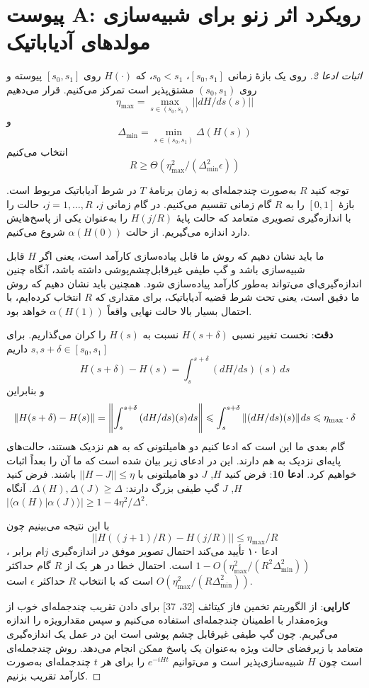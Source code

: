 \section{پیوست A: رویکرد اثر زنو برای شبیه‌سازی مولدهای آدیاباتیک}
\begin{proof}[اثبات ادعا 2]
 روی یک بازهٔ زمانی $[s_0, s_1]$، $s_0 < s_1$، که $H(\cdot)$ روی $[s_0, s_1]$ پیوسته و روی $(s_0, s_1)$ مشتق‌پذیر است تمرکز می‌کنیم. قرار می‌دهیم
  $$\eta_{\max} = \max_{s \in (s_0, s_1)} ||dH/ds(s)||$$ 
  و
   $$\Delta_{\min} = \min_{s \in (s_0, s_1)} \Delta(H(s))$$
 انتخاب می‌کنیم
  $$R \ge \Theta(\eta_{\max}^2 / (\Delta_{\min}^2 \epsilon))$$
 
 توجه کنید $R$ به‌صورت چندجمله‌ای به زمان برنامهٔ $T$ در شرط آدیاباتیک مربوط است. بازهٔ $[0,1]$ را به $R$ گام زمانی تقسیم می‌کنیم. در گام زمانی $j$، $j = 1, \ldots, R$، حالت را با اندازه‌گیری تصویری متعامد که حالت پایهٔ $H(j/R)$ را به‌عنوان یکی از پاسخ‌هایش دارد اندازه می‌گیریم. از حالت $\alpha(H(0))$ شروع می‌کنیم. 
 
 ما باید نشان دهیم که روش ما قابل پیاده‌سازی کارآمد است، یعنی اگر $H$ قابل شبیه‌سازی باشد و گپ طیفی غیرقابل‌چشم‌پوشی داشته باشد، آنگاه چنین اندازه‌گیری‌ای می‌تواند به‌طور کارآمد پیاده‌سازی شود. همچنین باید نشان دهیم که روش ما دقیق است، یعنی تحت شرط قضیه آدیاباتیک، برای مقداری که $R$ انتخاب کرده‌ایم، با احتمال بسیار بالا حالت نهایی واقعاً $\alpha(H(1))$ خواهد بود.

 \textbf{دقت}:
  نخست تغییر نسبی $H(s+\delta)$ نسبت به $H(s)$ را کران می‌گذاریم. برای $s, s+\delta \in [s_0, s_1]$ داریم
   $$H(s+\delta) - H(s) = \int_s^{s+\delta} (dH/ds)(s)\,ds$$
    و بنابراین
    \[\left\| {H(s + \delta ) - H(s)} \right\| = \left\| {\int_s^{s + \delta } {(dH/ds)} (s){\mkern 1mu} ds} \right\| \leqslant \int_s^{s + \delta } {\left\| {(dH/ds)(s)} \right\|} {\mkern 1mu} ds \leqslant {\eta _{\max }} \cdot \delta \]
    گام بعدی ما این است که ادعا کنیم دو هامیلتونی که به هم نزدیک هستند، حالت‌های پایه‌ای نزدیک به هم دارند. این در ادعای زیر بیان شده است که ما آن را بعداً اثبات خواهیم کرد.
  \textbf{ادعا 10}:
   فرض کنید $H$, $J$ دو هامیلتونی با $||H - J|| \le \eta$ باشند. فرض کنید $H$, $J$ گپ طیفی بزرگ دارند: $\Delta(H), \Delta(J) \ge \Delta$. آنگاه $|\langle\alpha(H)|\alpha(J)\rangle| \ge 1 - 4\eta^2/\Delta^2$. 
   
   با این نتیجه می‌بینیم چون
    $$||H((j+1)/R) - H(j/R)|| \le \eta_{\max}/R$$، 
   ادعا ۱۰ تأیید می‌کند احتمال تصویر موفق در اندازه‌گیری $j$ام برابر $1 - O(\eta_{\max}^2/(R^2 \Delta_{\min}^2))$ است. احتمال خطا در هر یک از $R$ گام حداکثر $O(\eta_{\max}^2/(R \Delta_{\min}^2))$ است که با انتخاب $R$ حداکثر $\epsilon$ است. 
  
  \textbf{کارایی}:
   از الگوریتم تخمین فاز کیتائف [32، 37] برای دادن تقریب چندجمله‌ای خوب از ویژه‌مقدار با اطمینان چندجمله‌ای استفاده می‌کنیم و سپس ‌مقدارویژه را اندازه می‌گیریم. چون گپ طیفی غیرقابل چشم پوشی است این در عمل یک اندازه‌گیری متعامد با زیرفضای ‌حالت ویژه به‌عنوان یک پاسخ ممکن انجام می‌دهد. روش چندجمله‌ای است چون $H$ شبیه‌سازی‌پذیر است و می‌توانیم $e^{-iHt}$ را برای هر $t$ چندجمله‌ای به‌صورت کارآمد تقریب بزنیم.
\end{proof}
